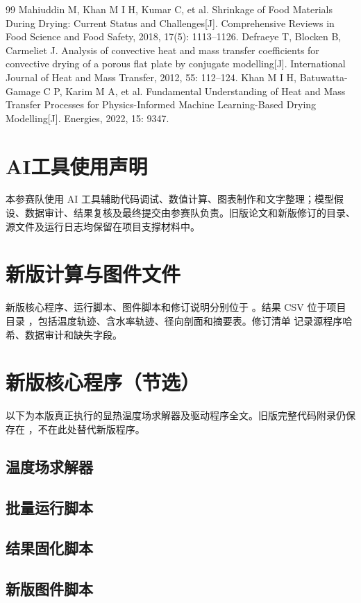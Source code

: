 \documentclass[withoutpreface,bwprint]{cumcmthesis}
\begin{document}
\begin{thebibliography}{99}
 Mahiuddin M, Khan M I H, Kumar C, et al. Shrinkage of Food Materials During Drying: Current Status and Challenges[J]. Comprehensive Reviews in Food Science and Food Safety, 2018, 17(5): 1113--1126.
 Defraeye T, Blocken B, Carmeliet J. Analysis of convective heat and mass transfer coefficients for convective drying of a porous flat plate by conjugate modelling[J]. International Journal of Heat and Mass Transfer, 2012, 55: 112--124.
 Khan M I H, Batuwatta-Gamage C P, Karim M A, et al. Fundamental Understanding of Heat and Mass Transfer Processes for Physics-Informed Machine Learning-Based Drying Modelling[J]. Energies, 2022, 15: 9347.
\end{thebibliography}

\section*{AI工具使用声明}
本参赛队使用 AI 工具辅助代码调试、数值计算、图表制作和文字整理；模型假设、数据审计、结果复核及最终提交由参赛队负责。旧版论文和新版修订的目录、源文件及运行日志均保留在项目支撑材料中。

\clearpage
\begin{appendices}
\section{新版计算与图件文件}
新版核心程序、运行脚本、图件脚本和修订说明分别位于 。结果 CSV 位于项目目录 ，包括温度轨迹、含水率轨迹、径向剖面和摘要表。修订清单  记录源程序哈希、数据审计和缺失字段。
\section{新版核心程序（节选）}
以下为本版真正执行的显热温度场求解器及驱动程序全文。旧版完整代码附录仍保存在 ，不在此处替代新版程序。
\subsection{温度场求解器}
\subsection{批量运行脚本}
\subsection{结果固化脚本}
\subsection{新版图件脚本}
\end{appendices}
\end{document}
